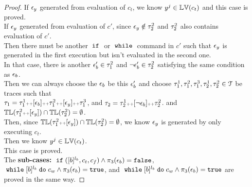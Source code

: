\begin{proof}
If $\mathtt{\epsilon}_y$ generated from evaluation of $c_t$, we know $y^j \in \mathbb{LV}(c_t)$ and this case is proved.
\\
If $\mathtt{\epsilon}_y$ generated from evaluation of $c'$, since $\mathtt{\epsilon}_y \notin \mathtt{\tau}^2_2$ and $\mathtt{\tau}^2_2$ also contains evaluation of $c'$.
\\
Then there must be another $\;\mathtt{if}\;$ or $\;\mathtt{while}\;$ command in $c'$ such that $\mathtt{\epsilon}_y$ is generated in the first execution 
but isn't evaluated in the second one.
\\
In that case, there is another $\mathtt{\epsilon}_b' \in \mathtt{\tau}_1^2$ and $\neg\mathtt{\epsilon}_b' \in \mathtt{\tau}^2_2$ satisfying the same condition as $\mathtt{\epsilon}_b$.
\\
Then we can always choose the $\mathtt{\epsilon}_b$ be this $\mathtt{\epsilon}_b'$ and choose $\mathtt{\tau}_1^1, \mathtt{\tau}_1^2, \mathtt{\tau}_1^3, \mathtt{\tau}_2^1, \mathtt{\tau}_2^2 \in \mathcal{T}$ be traces
such that 
\\
$\mathtt{\tau}_1 = \mathtt{\tau}_1^1 {\scriptscriptstyle ++} [\mathtt{\epsilon}_b] {\scriptscriptstyle ++}  \mathtt{\tau}_1^2 {\scriptscriptstyle ++} [\mathtt{\epsilon}_y] {\scriptscriptstyle ++} \mathtt{\tau}_1^3$,
and $\mathtt{\tau}_2 = \mathtt{\tau}^1_2 {\scriptscriptstyle ++} [\neg\mathtt{\epsilon}_b] {\scriptscriptstyle ++}  \mathtt{\tau}^2_2$.
and $\mathbb{TL}(\mathtt{\tau}_1^2 {\scriptscriptstyle ++} [\mathtt{\epsilon}_y]) \cap \mathbb{TL}(\mathtt{\tau}^2_2) = \emptyset$.
\\
Then, since $\mathbb{TL}(\mathtt{\tau}_1^2 {\scriptscriptstyle ++} [\mathtt{\epsilon}_y]) \cap \mathbb{TL}(\mathtt{\tau}^2_2) = \emptyset$, 
we know 
$\mathtt{\epsilon}_y$ is generated 
by only executing $c_t$.
\\
Then we know $y^j \in \mathbb{LV}(c_t)$.
\\
This case is proved.
\\
The \textbf{sub-cases:} 
{$\;\mathtt{if}\; ([b]^{l_b}, c_t, c_f) \land \pi_3(\mathtt{\epsilon}_b) = \mathtt{false}$},
$\;\mathtt{while}\; [b]^{l_b} \;\mathtt{do}\; c_w\land \pi_3(\mathtt{\epsilon}_b) = \mathtt{true}$, 
and $\;\mathtt{while}\; [b]^{l_b} \;\mathtt{do}\; c_w \land \pi_3(\mathtt{\epsilon}_b) = \mathtt{true}$ 
are proved in the same way.

\end{proof}
